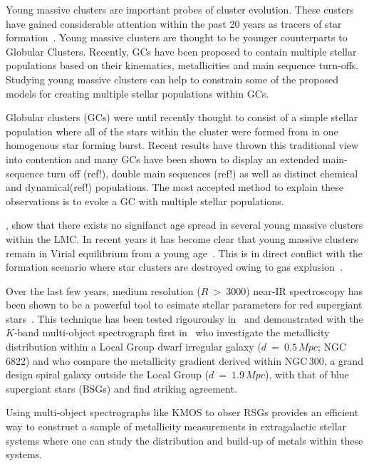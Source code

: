 \documentclass[useAMS,usenatbib]{mn2e}
\begin{document}
Young massive clusters are important probes of cluster evolution.
These custers have gained considerable attention within the past 20 years as tracers of star formation~\citep[e.g.][]{1995AJ....109..960W,1997AJ....114.2381M,1999AJ....118..752Z}.
Young massive clusters are thought to be younger counterparts to Globular Clusters.
Recently, GCs have been proposed to contain multiple stellar populations based on their kinematics, metallicities and main sequence turn-offs.
Studying young massive clusters can help to constrain some of the proposed models for creating multiple stellar populations within GCs.

Globular clusters (GCs) were until recently thought to consist of a simple stellar population where all of the stars within the cluster were formed from in one homogenous star forming burst.
Recent results have thrown this traditional view into contention and many GCs have been shown to display an extended main-sequence turn off (ref!), double main sequences (ref!) as well as distinct chemical~\citep{2012A&A...539A..19G} and dynamical(ref!) populations.
The most accepted method to explain these observations is to evoke a GC with multiple stellar populations.


\citet{2015A&A...575A..62N}, show that there exists no signifanct age spread in several young massive clusters within the LMC.
In recent years it has become clear that young massive clusters remain in Virial equilibrium from a young age~\citep{2014prpl.conf..291L}.
This is in direct conflict with the formation scenario where star clusters are destroyed owing to gas explusion~\citep[i.e. infant mortality][]{2003ARA&A..41...57L}.

Over the last few years, medium resolution ($R~>~3000$) near-IR spectroscopy has been shown to be a powerful tool to esimate stellar parameters for red supergiant stars~\citep[RSGs;][]{2010MNRAS.407.1203D}.
This technique has been tested rigouroulsy in~\cite{2014ApJ...788...58G,2015ApJ...806...21D} and demonstrated with the $K$-band multi-object spectrograph first in~\cite{2015ApJ...803...14P} who investigate the metallicity distribution within a Local Group dwarf irregular galaxy ($d~=~0.5\,Mpc$; NGC\,6822) and
\cite{2015ApJ...805..182G} who compare the metallicity gradient derived within NGC\,300, a grand design spiral galaxy outside the Local Group ($d~=~1.9\,Mpc$), with that of blue supergiant stars (BSGs) and find striking agreement.

Using multi-object spectrographs like KMOS to obser RSGs provides an efficient way to construct a sample of metallicity measurements in extragalactic stellar systems where one can study the distribution and build-up of metals within these systems.
\end{document}
